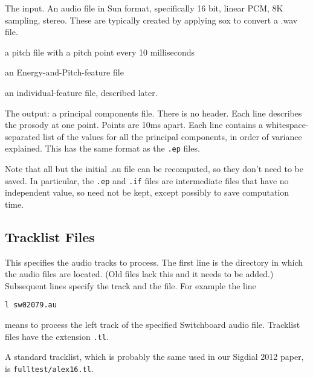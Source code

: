 \documentclass[11pt]{article}
\begin{document}
\begin{description}   \setlength{\itemsep}{0pt}\setlength{\parskip}{0pt}

\item [.au] The input.  An audio file in Sun format, specifically 16
  bit, linear PCM, 8K sampling, stereo.  These are typically created
  by applying sox to convert a .wav file.

\item[.f0] a pitch file with a pitch point every 10 milliseconds 

\item[.ep] an Energy-and-Pitch-feature file

\item[.if] an individual-feature file, described later.

\item[.pc] The output: a principal components file.  There is no
  header.  Each line describes the prosody at one point.  Points are
  10ms apart.  Each line contains a whitespace-separated list of the
  values for all the principal components, in order of variance
  explained.  This has the same format as the {\tt .ep} files. 
\end{description}

Note that all but the initial .au file can be recomputed, so they
don't need to be saved.  In particular, the {\tt .ep} and {\tt .if}
files are intermediate files that have no independent value, so need
not be kept, except possibly to save computation time.


\subsection{Tracklist Files}       \label{tracklist-files}

This specifies the audio tracks to process.  The first line is the
directory in which the audio files are located.  (Old files lack this
and it needs to be added.)  Subsequent lines specify the track and the
file.  For example the line

\begin{verbatim}
l sw02079.au
\end{verbatim}

means to process the left track of the specified Switchboard audio
file.  Tracklist files have the extension {\tt .tl}. 

A standard tracklist, which is probably the same used in our Sigdial
2012 paper, is {\tt fulltest/alex16.tl}.
\end{document}
